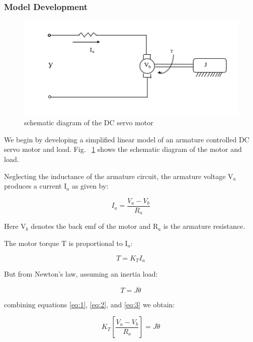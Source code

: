 \documentclass[11pt,a4paper]{article}
\begin{document}
\subsubsection{Model Development}
\begin{figure}[here]
\includegraphics[width=\textwidth]{imglab/servoschemdiagram.png}
\caption{schematic diagram of the DC servo motor}
\label{fig:servoschem}
\end{figure}

We begin by developing a simplified linear model of an armature controlled DC servo motor and load. Fig. ~\ref{fig:servoschem} shows the schematic diagram of the motor and load.

Neglecting the inductance of the armature circuit, the armature voltage V$_{a}$ produces a current I$_{a}$ as given by:

\begin{equation} \label{eq:1}
I_{a} = \frac{V_{a}-V_{b}}{R_{a}}
\end{equation}

Here V$_{b}$ denotes the back emf of the motor and R$_{a}$ is the armature resistance.

The motor torque T is proportional to I$_{a}$:

\begin{equation} \label{eq:2}
T = K_{T}I_{a}
\end{equation}

But from Newton's law, assuming an inertia load:

\begin{equation} \label{eq:3}
T = J\ddot{\theta}
\end{equation}

combining equations \ref{eq:1}, \ref{eq:2}, and \ref{eq:3} we obtain:

\begin{equation} \label{eq:4}
K_{T}\left[\frac{V_{a}-V_{b}}{R_{a}}\right] = J\ddot{\theta}
\end{equation} 
\end{document}
